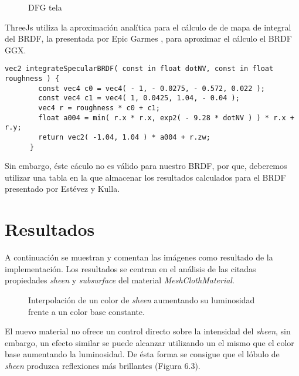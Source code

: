       \begin{figure}[H]
        \vspace{0.5cm}
        \centering
        \caption{DFG tela}
      \end{figure}

      ThreeJs utiliza la aproximaci\'on anal\'itica para el c\'alculo de de mapa de integral del BRDF,
      la presentada por Epic Garmes \autocite{shadingmobile}, para aproximar el c\'alculo el BRDF GGX.\\

      \begin{lstlisting}[caption=Apromixaci\'on anal\'itica a la integral del BRDF en ThreeJs]
      vec2 integrateSpecularBRDF( const in float dotNV, const in float roughness ) {
        const vec4 c0 = vec4( - 1, - 0.0275, - 0.572, 0.022 );
        const vec4 c1 = vec4( 1, 0.0425, 1.04, - 0.04 );
        vec4 r = roughness * c0 + c1;
        float a004 = min( r.x * r.x, exp2( - 9.28 * dotNV ) ) * r.x + r.y;
        return vec2( -1.04, 1.04 ) * a004 + r.zw;
      }
      \end{lstlisting}
      \singlespacing

      Sin embargo, \'este c\'aculo no es v\'alido para nuestro BRDF, por que, deberemos utilizar una
      tabla en la que almacenar los resultados calculados para el BRDF presentado por Est\'evez y Kulla.
    \egroup

\vspace{1cm}
\section{Resultados}

A continuaci\'on se muestran y comentan las im\'agenes como resultado de la implementaci\'on. Los resultados se centran
en el an\'alisis de las citadas propiedades \textit{sheen} y \textit{subsurface} del material \textit{MeshClothMaterial}.

\begin{figure}[H]
  \vspace{0.5cm}
  \centering
  \caption{Interpolaci\'on de un color de \textit{sheen} aumentando su luminosidad frente a un color base constante.}
\end{figure}

El nuevo material no ofrece un control directo sobre la intensidad del \textit{sheen}, sin embargo, un efecto similar se puede
alcanzar utilizando un el mismo que el color base aumentando la luminosidad. De \'esta forma se consigue que el l\'obulo
de \textit{sheen} produzca reflexiones m\'as brillantes (Figura 6.3).

